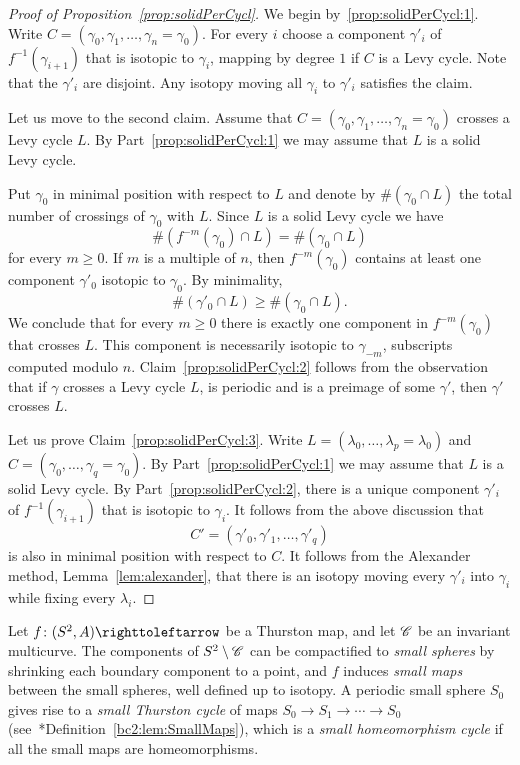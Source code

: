 \documentclass{amsart}
\begin{document}
\begin{proof}[Proof of Proposition~\ref{prop:solidPerCycl}]
  We begin by~\eqref{prop:solidPerCycl:1}. Write
  $C=(\gamma_0,\gamma_1,\dots,\gamma_n=\gamma_0)$. For every $i$
  choose a component $\gamma'_i$ of $f^{-1}(\gamma_{i+1})$ that is
  isotopic to $\gamma_i$, mapping by degree $1$ if $C$ is a Levy
  cycle. Note that the $\gamma'_i$ are disjoint. Any isotopy moving
  all $\gamma_i$ to $\gamma'_i$ satisfies the claim.

  Let us move to the second claim. Assume that
  $C=(\gamma_0,\gamma_1,\dots,\gamma_n=\gamma_0)$ crosses a Levy cycle
  $L$. By Part~\eqref{prop:solidPerCycl:1} we may assume that $L$
  is a solid Levy cycle.

  Put $\gamma_0$ in minimal position with respect to $L$ and denote
  by $\#(\gamma_0\cap L)$ the total number of crossings of
  $\gamma_0$ with $L$. Since $L$ is a solid Levy cycle we have
  \[\#(f^{-m}(\gamma_0)\cap L)=\#(\gamma_0\cap L)
  \]
  for every $m\ge 0$. If $m$ is a multiple of $n$, then
  $f^{-m}(\gamma_0)$ contains at least one component $\gamma'_0$
  isotopic to $\gamma_0$. By minimality,
  \[\#(\gamma'_0\cap L)\ge \#(\gamma_0\cap L).
  \]
  We conclude that for every $m\ge0$ there is exactly one component in
  $f^{-m}(\gamma_0)$ that crosses $L$. This component is necessarily
  isotopic to $\gamma_{-m}$, subscripts computed modulo
  $n$. Claim~\eqref{prop:solidPerCycl:2} follows from the observation
  that if $\gamma$ crosses a Levy cycle $L$, is periodic and is a
  preimage of some $\gamma'$, then $\gamma'$ crosses $L$.

  Let us prove Claim~\eqref{prop:solidPerCycl:3}. Write
  $L=(\lambda_0,\dots,\lambda_p=\lambda_0)$ and
  $C=(\gamma_0,\dots, \gamma_q=\gamma_0)$. By
  Part~\eqref{prop:solidPerCycl:1} we may assume that $L$ is a solid
  Levy cycle. By Part~\eqref{prop:solidPerCycl:2}, there is a unique
  component $\gamma'_i$ of $f^{-1}(\gamma_{i+1})$ that is isotopic to
  $\gamma_i$.  It follows from the above discussion that
  \[C'=(\gamma'_0,\gamma'_1,\dots, \gamma'_q)
  \]
  is also in minimal position with respect to $C$. It follows from the
  Alexander method, Lemma~\ref{lem:alexander}, that there is an
  isotopy moving every $\gamma'_i$ into $\gamma_i$ while fixing every
  $\lambda_i$.
\end{proof}

Let $f\colon(S^2,A)\selfmap$ be a Thurston map, and let ${\mathscr C}$ be an
invariant multicurve. The components of $S^2\setminus{\mathscr C}$ can be
compactified to \emph{small spheres} by shrinking each boundary
component to a point, and $f$ induces \emph{small maps} between the
small spheres, well defined up to isotopy. A periodic small sphere
$S_0$ gives rise to a \emph{small Thurston cycle} of maps
$S_0\to S_1\to\cdots\to S_0$ (see~\cite{bartholdi-dudko:bc2}*{Definition~\ref{bc2:lem:SmallMaps}}), which is a \emph{small homeomorphism
  cycle} if all the small maps are homeomorphisms.
\end{document}
